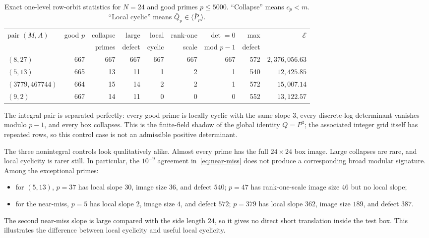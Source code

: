 \documentclass[11pt]{article}
\theoremstyle{definition}
\theoremstyle{remark}
\begin{document}
\begin{table}[htbp]
\centering
\small
\setlength{\tabcolsep}{4.5pt}
\begin{tabular}{@{}lrrrrrrrr@{}}
\toprule
pair $(M,A)$ & good $p$ & collapse & large & local & rank-one & $\det=0$ & max & $\mathscr E$\\
&& primes & defect & cyclic & scale & mod $p-1$ & defect & \\
\midrule
$(8,27)$ & 667 & 667 & 667 & 667 & 667 & 667 & 572 & $2{,}376{,}056.63$\\
$(5,13)$ & 665 & 13 & 11 & 1 & 2 & 1 & 540 & $12{,}425.85$\\
$(3779,467744)$ & 664 & 15 & 14 & 2 & 2 & 1 & 572 & $15{,}007.14$\\
$(9,2)$ & 667 & 14 & 11 & 0 & 0 & 0 & 552 & $13{,}122.57$\\
\bottomrule
\end{tabular}
\caption{Exact one-level row-orbit statistics for $N=24$ and good primes $p\le5000$.  ``Collapse'' means $c_p<m$.  ``Local cyclic'' means $\bar Q_p\in\langle\bar P_p\rangle$.}
\label{tab:scout}
\end{table}

The integral pair is separated perfectly: every good prime is locally cyclic with the same slope $3$, every discrete-log determinant vanishes modulo $p-1$, and every box collapses.  This is the finite-field shadow of the global identity $Q=P^3$; the associated integer grid itself has repeated rows, so this control case is not an admissible positive determinant.

The three nonintegral controls look qualitatively alike.  Almost every prime has the full $24\times24$ box image.  Large collapses are rare, and local cyclicity is rarer still.  In particular, the $10^{-9}$ agreement in~\eqref{eq:near-miss} does not produce a corresponding broad modular signature.  Among the exceptional primes:
\begin{itemize}
\item for $(5,13)$, $p=37$ has local slope $30$, image size $36$, and defect $540$; $p=47$ has rank-one-scale image size $46$ but no local slope;
\item for the near-miss, $p=5$ has local slope $2$, image size $4$, and defect $572$; $p=379$ has local slope $362$, image size $189$, and defect $387$.
\end{itemize}
The second near-miss slope is large compared with the side length $24$, so it gives no direct short translation inside the test box.  This illustrates the difference between local cyclicity and useful local cyclicity.
\end{document}
